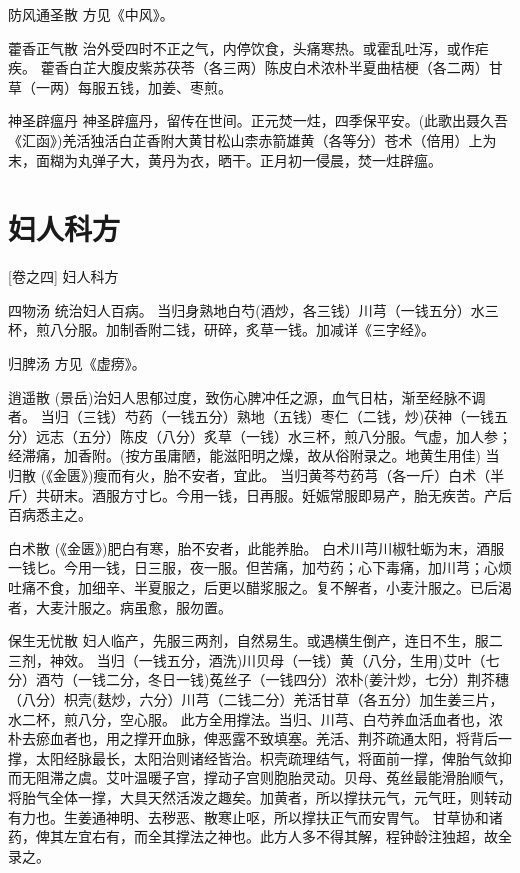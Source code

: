\documentclass[a4paper,12pt,UTF8,twoside]{ctexbook}
\begin{document}
	防风通圣散
	方见《中风》。
	
	藿香正气散
	治外受四时不正之气，内停饮食，头痛寒热。或霍乱吐泻，或作疟疾。
	藿香白芷大腹皮紫苏茯苓（各三两）陈皮白术浓朴半夏曲桔梗（各二两）甘草（一两）每服五钱，加姜、枣煎。
	
	神圣辟瘟丹
	神圣辟瘟丹，留传在世间。正元焚一炷，四季保平安。(此歌出聂久吾《汇函》)羌活独活白芷香附大黄甘松山柰赤箭雄黄（各等分）苍术（倍用）上为末，面糊为丸弹子大，黄丹为衣，晒干。正月初一侵晨，焚一炷辟瘟。
	
	

	\chapter{妇人科方}
		[卷之四] 妇人科方	
	
	四物汤
	统治妇人百病。
	当归身熟地白芍(酒炒，各三钱）川芎（一钱五分）水三杯，煎八分服。加制香附二钱，研碎，炙草一钱。加减详《三字经》。
	
	归脾汤
	方见《虚痨》。
	
	逍遥散
	(景岳)治妇人思郁过度，致伤心脾冲任之源，血气日枯，渐至经脉不调者。
	当归（三钱）芍药（一钱五分）熟地（五钱）枣仁（二钱，炒)茯神（一钱五分）远志（五分）陈皮（八分）炙草（一钱）水三杯，煎八分服。气虚，加人参；经滞痛，加香附。(按方虽庸陋，能滋阳明之燥，故从俗附录之。地黄生用佳)
	当归散
	(《金匮》)瘦而有火，胎不安者，宜此。
	当归黄芩芍药芎（各一斤）白术（半斤）共研末。酒服方寸匕。今用一钱，日再服。妊娠常服即易产，胎无疾苦。产后百病悉主之。
	
	白术散
	(《金匮》)肥白有寒，胎不安者，此能养胎。
	白术川芎川椒牡蛎为末，酒服一钱匕。今用一钱，日三服，夜一服。但苦痛，加芍药；心下毒痛，加川芎；心烦吐痛不食，加细辛、半夏服之，后更以醋浆服之。复不解者，小麦汁服之。已后渴者，大麦汁服之。病虽愈，服勿置。
	
	保生无忧散
	妇人临产，先服三两剂，自然易生。或遇横生倒产，连日不生，服二三剂，神效。
	当归（一钱五分，酒洗)川贝母（一钱）黄（八分，生用)艾叶（七分）酒芍（一钱二分，冬日一钱)菟丝子（一钱四分）浓朴(姜汁炒，七分）荆芥穗（八分）枳壳(麸炒，六分）川芎（二钱二分）羌活甘草（各五分）加生姜三片，水二杯，煎八分，空心服。
	此方全用撑法。当归、川芎、白芍养血活血者也，浓朴去瘀血者也，用之撑开血脉，俾恶露不致填塞。羌活、荆芥疏通太阳，将背后一撑，太阳经脉最长，太阳治则诸经皆治。枳壳疏理结气，将面前一撑，俾胎气敛抑而无阻滞之虞。艾叶温暖子宫，撑动子宫则胞胎灵动。贝母、菟丝最能滑胎顺气，将胎气全体一撑，大具天然活泼之趣矣。加黄者，所以撑扶元气，元气旺，则转动有力也。生姜通神明、去秽恶、散寒止呕，所以撑扶正气而安胃气。
	甘草协和诸药，俾其左宜右有，而全其撑法之神也。此方人多不得其解，程钟龄注独超，故全录之。
	
\end{document}
